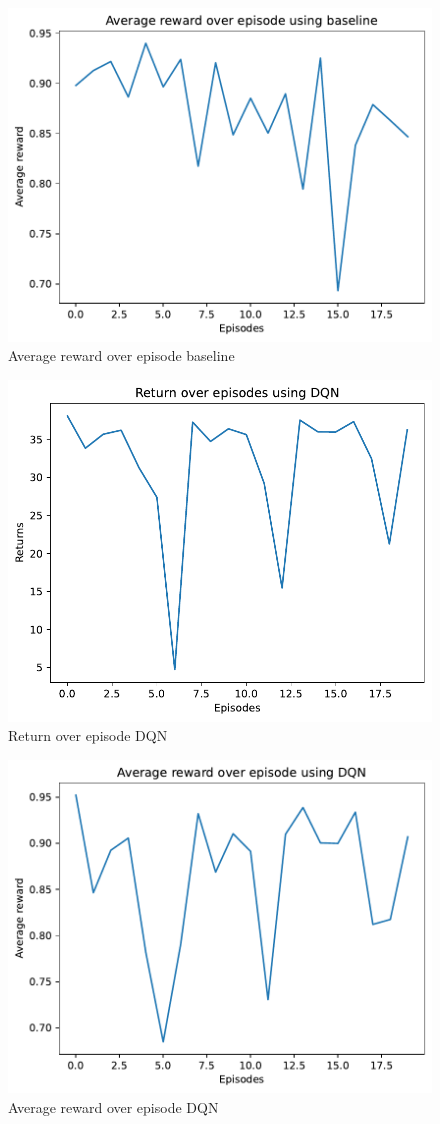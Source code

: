 \documentclass{article}
\begin{document}
\begin{figure}
    \centering
    \includegraphics[width=0.7\linewidth]{img/Average_reward_over_episode_baseline.pdf}
    \caption{Average reward over episode baseline}
    \label{fig:Reward_episode_baseline}
\end{figure}

\begin{figure}
    \centering
    \includegraphics[width=0.7\linewidth]{img/Return_over_episode_DQN_4000.pdf}
    \caption{Return over episode DQN}
    \label{fig:Return_episode_DQN}
\end{figure}

\begin{figure}
    \centering
    \includegraphics[width=0.7\linewidth]{img/Average_reward_over_episode_DQN_4000.pdf}
    \caption{Average reward over episode DQN}
    \label{fig:Reward_episode_DQN}
\end{figure}
\end{document}
